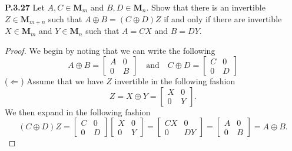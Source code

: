 \documentclass[12pt]{amsart}
\begin{document}
\begin{onehalfspace}
        \noindent\textbf{P.3.27} Let $A,C\in\mathbf{M}_m$ and $B,D\in\mathbf{M}_n$.
        Show that there is an invertible $Z\in\mathbf{M}_{m+n}$ such that $A\oplus B = (C\oplus D)Z$ if and only if
        there are invertible $X\in\mathbf{M}_m$ and $Y\in\mathbf{M}_n$ such that $A=CX$ and $B=DY$.
        \begin{proof}
            We begin by noting that we can write the following
            \begin{displaymath}
                A\oplus B = \left[\begin{matrix}
                                      A & 0\\
                                      0 & B
                \end{matrix}\right]
                \quad\text{and}\quad
                C\oplus D = \left[\begin{matrix}
                                      C & 0\\
                                      0 & D
                \end{matrix}\right]
            \end{displaymath}
            ($\Leftarrow$) Assume that we have $Z$ invertible in the following fashion
            \begin{displaymath}
                Z = X\oplus Y = \left[\begin{matrix}
                                          X & 0\\
                                          0 & Y
                \end{matrix}\right].
            \end{displaymath}
            We then expand in the following fashion
            \begin{displaymath}
                (C\oplus D)Z =
                \left[\begin{matrix}
                          C & 0\\
                          0 & D
                \end{matrix}\right]
                \left[\begin{matrix}
                          X & 0\\
                          0 & Y
                \end{matrix}\right] =
                \left[\begin{matrix}
                                         CX & 0\\
                                         0 & DY
                \end{matrix}\right] =
                \left[\begin{matrix}
                                         A & 0\\
                                         0 & B
            \end{matrix}\right] = A\oplus B.
            \end{displaymath}


\end{proof}
\end{onehalfspace}
\end{document}
